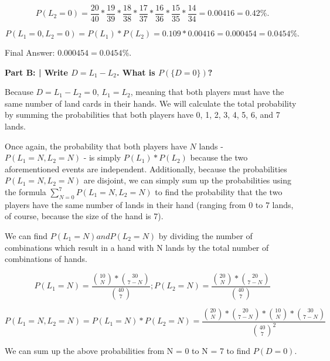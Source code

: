 \documentclass{article}
\begin{document}
 \begin{displaymath}
    P(L_2 = 0) = \frac{20}{40}*\frac{19}{39}*\frac{18}{38}*\frac{17}{37}*\frac{16}{36}*\frac{15}{35}*\frac{14}{34} = 0.00416 = 0.42\%.
 \end{displaymath}
 
 \begin{displaymath}
    P(L_1 = 0, L_2 = 0) = P(L_1)*P(L_2) = 0.109 * 0.00416 = 0.000454 = 0.0454\%.
 \end{displaymath}
 
 Final Answer: $0.000454 = 0.0454\%$.\newline
 
 \textbf{Part B: | Write $D = L_1 - L_2$. What is $P(\{D=0\})$?}\newline
 
 Because $D = L_1 - L_2 = 0$, $L_1 = L_2$, meaning that both players must have the same number of land cards in their hands. We will calculate the total probability by summing the probabilities that both players have 0, 1, 2, 3, 4, 5, 6, and 7 lands.\newline
 
 Once again, the probability that both players have $N$ lands - $P(L_1=N,L_2=N)$ - is simply $P(L_1)*P(L_2)$ because the two aforementioned events are independent. Additionally, because the probabilities $P(L_1=N,L_2=N)$ are disjoint, we can simply sum up the probabilities using the formula $\sum_{N=0}^{7}P(L_1=N,L_2=N)$ to find the probability that the two players have the same number of lands in their hand (ranging from 0 to 7 lands, of course, because the size of the hand is 7).\newline
 
 We can find $P(L_1=N) and P(L_2=N)$ by dividing the number of combinations which result in a hand with N lands by the total number of combinations of hands.
 
 \begin{displaymath}
    P(L_1=N)=\frac{{10 \choose N}*{30 \choose 7-N}}{{40 \choose 7}};    P(L_2=N)=\frac{{20 \choose N}*{20 \choose 7-N}}{{40 \choose 7}}
 \end{displaymath}
 
 \begin{displaymath}
    P(L_1=N, L_2=N)=P(L_1=N)*P(L_2=N)=\frac{{20 \choose N}*{20 \choose 7-N}*{10 \choose N}*{30 \choose 7-N}}{{40 \choose 7}^2}
 \end{displaymath}
 
 We can sum up the above probabilities from N = 0 to N = 7 to find $P(D=0)$.
 
\end{document}
